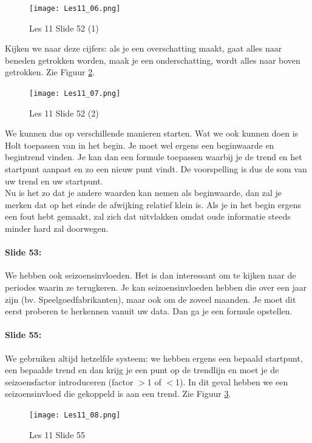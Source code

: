 \documentclass[10pt,a4paper]{report}
\begin{document}
\begin{figure}[h!]
\centering
\texttt{[image: Les11\_06.png]}
\caption{Les 11 Slide 52 (1)} 
\label{les11_06}
\end{figure}

Kijken we naar deze cijfers: als je een overschatting maakt, gaat alles naar beneden getrokken worden, maak je een onderschatting, wordt alles naar boven getrokken. Zie Figuur \ref{les11_07}.\\

\begin{figure}[h!]
\centering
\texttt{[image: Les11\_07.png]}
\caption{Les 11 Slide 52 (2)} 
\label{les11_07}
\end{figure}

We kunnen dus op verschillende manieren starten. Wat we ook kunnen doen is Holt toepassen van in het begin. Je moet wel ergens een beginwaarde en begintrend vinden. Je kan dan een formule toepassen waarbij je de trend en het startpunt aanpast en zo een nieuw punt vindt. De voorspelling is dus de som van uw trend en uw startpunt.\\
Nu is het zo dat je andere waarden kan nemen als beginwaarde, dan zal je merken dat op het einde de afwijking relatief klein is. Als je in het begin ergens een fout hebt gemaakt, zal zich dat uitvlakken omdat oude informatie steeds minder hard zal doorwegen. 

\paragraph{Slide 53:} We hebben ook seizoensinvloeden. Het is dan interessant om te kijken naar de periodes waarin ze terugkeren. Je kan seizoensinvloeden hebben die over een jaar zijn (bv. Speelgoedfabrikanten), maar ook om de zoveel maanden. Je moet dit eerst proberen te herkennen vanuit uw data. Dan ga je een formule opstellen.

\paragraph{Slide 55:} We gebruiken altijd hetzelfde systeem: we hebben ergens een bepaald startpunt, een bepaalde trend en dan krijg je een punt op de trendlijn en moet je de seizoensfactor introduceren (factor $>$1 of $<$1). In dit geval hebben we een seizoensinvloed die gekoppeld is aan een trend. Zie Figuur \ref{les11_08}.

\begin{figure}[h!]
\centering
\texttt{[image: Les11\_08.png]}
\caption{Les 11 Slide 55} 
\label{les11_08}
\end{figure}
\end{document}
